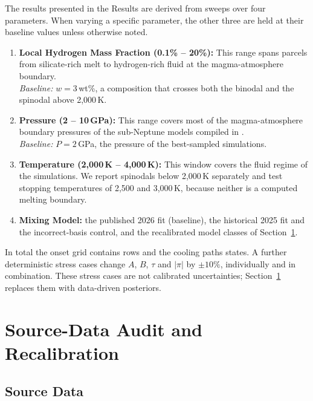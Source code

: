 The results presented in the Results are derived from sweeps over four parameters. When
varying a specific parameter, the other three are held at their baseline values unless
otherwise noted.
\begin{enumerate}
\item \textbf{Local Hydrogen Mass Fraction (0.1\% -- 20\%):} This range spans parcels from
silicate-rich melt to hydrogen-rich fluid at the magma-atmosphere boundary.\\
\textit{Baseline:} $w = 3$\,wt\%, a composition that crosses both the binodal and the
spinodal above 2,000\,K.
\item \textbf{Pressure (2 -- 10\,GPa):} This range covers most of the magma-atmosphere
boundary pressures of the sub-Neptune models compiled in \cite{gilmore2026}.\\
\textit{Baseline:} $P = 2$\,GPa, the pressure of the best-sampled simulations.
\item \textbf{Temperature (2,000\,K -- 4,000\,K):} This window covers the fluid regime of the
simulations. We report spinodals below 2,000\,K separately and test stopping temperatures of
2,500 and 3,000\,K, because neither is a computed melting boundary.
\item \textbf{Mixing Model:} the published 2026 fit (baseline), the historical 2025 fit and
the incorrect-basis control, and the recalibrated model classes of
Section~\ref{sec:recalibration}.
\end{enumerate}
In total the onset grid contains \nOnsetRows{} rows and the cooling paths \nCoolingRows{}
states. A further \nStressRows{} deterministic stress cases change $A$, $B$, $\tau$ and
$|\pi|$ by $\pm10\%$, individually and in combination. These stress cases are not calibrated
uncertainties; Section~\ref{sec:recalibration} replaces them with data-driven posteriors.

\section{Source-Data Audit and Recalibration}\label{sec:recalibration}

\subsection{Source Data}

